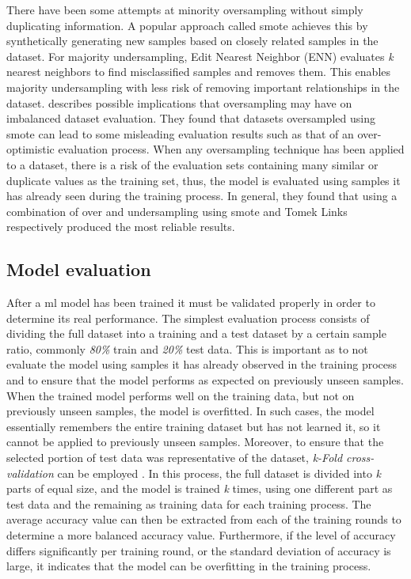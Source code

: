 There have been some attempts at minority oversampling without simply duplicating information. A popular approach called \acrfull{smote} \parencite{Chawla2002} achieves this by synthetically generating new samples based on closely related samples in the dataset. For majority undersampling, Edit Nearest Neighbor (ENN) evaluates \textit{k} nearest neighbors to find misclassified samples and removes them. This enables majority undersampling with less risk of removing important relationships in the dataset. \cite{cv_imbalance} describes possible implications that oversampling may have on imbalanced dataset evaluation. They found that datasets oversampled using \acrshort{smote} can lead to some misleading evaluation results such as that of an over-optimistic evaluation process. When any oversampling technique has been applied to a dataset, there is a risk of the evaluation sets containing many similar or duplicate values as the training set, thus, the model is evaluated using samples it has already seen during the training process. In general, they found that using a combination of over and undersampling using \acrshort{smote} and Tomek Links \parencite{tomek} respectively produced the most reliable results.

\subsection{Model evaluation}
\label{sec:model_evaluation}

After a \acrfull{ml} model has been trained it must be validated properly in order to determine its real performance. The simplest evaluation process consists of dividing the full dataset into a training and a test dataset by a certain sample ratio, commonly \textit{80\%} train and \textit{20\%} test data. This is important as to not evaluate the model using samples it has already observed in the training process and to ensure that the model performs as expected on previously unseen samples. When the trained model performs well on the training data, but not on previously unseen samples, the model is overfitted. In such cases, the model essentially remembers the entire training dataset but has not learned it, so it cannot be applied to previously unseen samples. Moreover, to ensure that the selected portion of test data was representative of the dataset, \textit{k-Fold cross-validation} can be employed \parencite{ghojogh2019theory}. In this process, the full dataset is divided into \textit{k} parts of equal size, and the model is trained \textit{k} times, using one different part as test data and the remaining as training data for each training process. The average accuracy value can then be extracted from each of the training rounds to determine a more balanced accuracy value. Furthermore, if the level of accuracy differs significantly per training round, or the standard deviation of accuracy is large, it indicates that the model can be overfitting in the training process.
